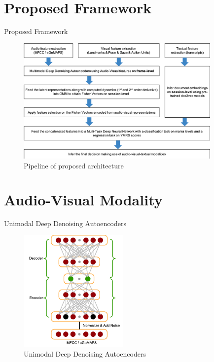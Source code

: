 \documentclass{beamer}
\begin{document}
\section{Proposed Framework}

\begin{frame}{Proposed Framework}

\begin{figure}[ht]
    \centering
    \includegraphics[width=10cm]{images/general_pipeline.png}
    \caption{Pipeline of proposed architecture}
    \label{fig:pipeline}
\end{figure}

\end{frame}

\section{Audio-Visual Modality}

\begin{frame}{Unimodal Deep Denoising Autoencoders}

\begin{figure}[ht]
    \centering
    \includegraphics[height=6cm]{images/unimodal_ae_A.png}
    \caption{Unimodal Deep Denoising Autoencoders}
    \label{fig:unimodal}
\end{figure}

\end{frame}
\end{document}
